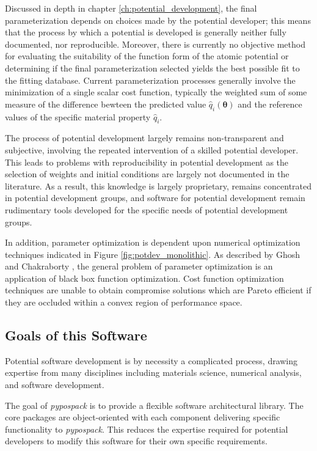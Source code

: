 Discussed in depth in chapter \ref{ch:potential_development}, the final parameterization depends on choices made by the potential developer; this means that the process by which a potential is developed is generally neither fully documented, nor reproducible.  Moreover, there is currently no objective method for evaluating the suitability of the function form of the atomic potential or determining if the final parameterization selected yields the best possible fit to the fitting database.  Current parameterization processes generally involve the minimization of a single scalar cost function, typically the weighted sum of some measure of the difference bewteen the predicted value $\hat{q}_i(\bm{\theta})$ and the reference values of the specific material property $\hat{q}_i$.

The process of potential development largely remains non-transparent and subjective\cite{martinez2013_fitting,martinez2016_posmat}, involving the repeated intervention of a skilled potential developer\cite{brenner2000_fitting}.
This leads to problems with reproducibility in potential development as the selection of weights and initial conditions are largely not documented in the literature.
As a result, this knowledge is largely proprietary, remains concentrated in potential development groups, and software for potential development remain rudimentary tools developed for the specific needs of potential development groups.

In addition, parameter optimization is dependent upon numerical optimization techniques indicated in Figure \ref{fig:potdev_monolithic}.  As described by Ghosh and Chakraborty \cite{ghosh2014_potdev_pareto}, the general problem of parameter optimization is an application of black box function optimization.  Cost function optimization techniques are unable to obtain compromise solutions which are Pareto efficient if they are occluded within a convex region of performance space.

\subsection{Goals of this Software}

Potential software development is by necessity a complicated process, drawing expertise from many disciplines including materials science, numerical analysis, and software development.

The goal of \emph{pypospack} is to provide a flexible software architectural library.  The core packages are object-oriented with each component delivering specific functionality to \emph{pypospack}.  This reduces the expertise required for potential developers to modify this software for their own specific requirements.

